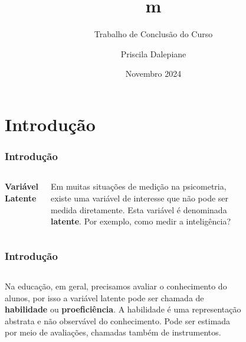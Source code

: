 \documentclass{beamer}
\title[TRI] %
{m}
\subtitle{Trabalho de Conclusão do Curso}
\author[Priscila] %
{Priscila Dalepiane}
\institute[UFMT] %
{
	
	Bacharelado em Estatística\\
	Universidade Federal de Mato Grosso
	
}
\date[2024] %
{Novembro 2024}
\begin{document}
	
	\frame{\titlepage}

	
	\section{Introdução}
	
		\begin{frame}
		
		\frametitle{Introdução}
		\begin{columns}
			
			
			\begin{center}
				\textbf{Variável Latente}
			\end{center}
			
			Em muitas situações de medição na psicometria, existe uma variável de interesse que não pode ser medida diretamente. Esta variável é denominada \textbf{latente}. \newline  Por exemplo, como medir a inteligência?
			
	

			
			
			\begin{figure}
			\end{figure}
			
			
		\end{columns}

		
		
\end{frame}
	\begin{frame}
		
		\frametitle{Introdução}
		\begin{columns}
		
		\column{0.6\textwidth}
		
		Na educação, em geral, precisamos avaliar o conhecimento do alunos, por isso a variável latente pode ser chamada de \textbf{habilidade} ou \textbf{proeficiência}.
		A habilidade é uma representação abstrata e não observável do conhecimento.	\newline\newline
		Pode ser estimada por meio de avaliações, chamadas também de instrumentos.

		\column{0.4\textwidth}
		
		\begin{figure}
		\end{figure}	
		
		\end{columns}
			
\end{frame}
\end{document}
